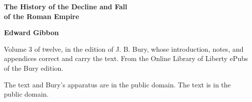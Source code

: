\documentclass[11pt,letterpaper]{article}
\begin{document}
\color{ink}

\begin{titlepage}
\centering
\vspace*{4em}
{\LARGE\bfseries\color{heading} The History of the Decline and Fall\\[0.3em]of the Roman Empire\par}
\vspace{2em}
{\Large\bfseries\color{heading} Edward Gibbon\par}
\vspace{2.5em}
{\itshape\color{subhead}\parbox{0.8\linewidth}{\centering Volume 3 of twelve, in the edition of J. B. Bury, whose introduction, notes, and appendices correct and carry the text. From the Online Library of Liberty ePubs of the Bury edition.\par}}
\vfill
{\small The text and Bury's apparatus are in the public domain. The text is in the public domain.\par}
\vspace{2em}
\end{titlepage}

\tableofcontents


\end{document}
